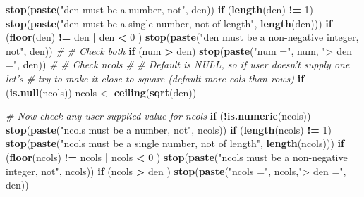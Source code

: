 \documentclass[9pt,letter]{article}
\newenvironment{Shaded}{\begin{snugshade}}{\end{snugshade}}
\newcommand{\KeywordTok}[1]{\textcolor[rgb]{0.13,0.29,0.53}{\textbf{#1}}}
\newcommand{\DecValTok}[1]{\textcolor[rgb]{0.00,0.00,0.81}{#1}}
\newcommand{\StringTok}[1]{\textcolor[rgb]{0.31,0.60,0.02}{#1}}
\newcommand{\CommentTok}[1]{\textcolor[rgb]{0.56,0.35,0.01}{\textit{#1}}}
\newcommand{\ControlFlowTok}[1]{\textcolor[rgb]{0.13,0.29,0.53}{\textbf{#1}}}
\newcommand{\OperatorTok}[1]{\textcolor[rgb]{0.81,0.36,0.00}{\textbf{#1}}}
\newcommand{\NormalTok}[1]{#1}
\begin{document}
\begin{enumerate}
\begin{Shaded}
\begin{Highlighting}[]
    \KeywordTok{stop}\NormalTok{(}\KeywordTok{paste}\NormalTok{(}\StringTok{"den must be a number, not"}\NormalTok{, den))}
  \ControlFlowTok{if}\NormalTok{ (}\KeywordTok{length}\NormalTok{(den) }\OperatorTok{!=}\StringTok{ }\DecValTok{1}\NormalTok{)}
    \KeywordTok{stop}\NormalTok{(}\KeywordTok{paste}\NormalTok{(}\StringTok{"den must be a single number, not of length"}\NormalTok{,}
               \KeywordTok{length}\NormalTok{(den)))}
  \ControlFlowTok{if}\NormalTok{ (}\KeywordTok{floor}\NormalTok{(den) }\OperatorTok{!=}\StringTok{ }\NormalTok{den }\OperatorTok{|}\StringTok{ }\NormalTok{den }\OperatorTok{<}\StringTok{ }\DecValTok{0}\NormalTok{ )}
    \KeywordTok{stop}\NormalTok{(}\KeywordTok{paste}\NormalTok{(}\StringTok{"den must be a non-negative integer, not"}\NormalTok{,}
\NormalTok{               den))}
  \CommentTok{#}
  \CommentTok{#  Check both}
  \ControlFlowTok{if}\NormalTok{ (num }\OperatorTok{>}\StringTok{ }\NormalTok{den)}
    \KeywordTok{stop}\NormalTok{(}\KeywordTok{paste}\NormalTok{(}\StringTok{"num ="}\NormalTok{, num, }\StringTok{"> den ="}\NormalTok{, den))}
  \CommentTok{#}
  \CommentTok{#  Check ncols}
  \CommentTok{#}
  \CommentTok{#  Default is NULL, so if user doesn't supply one let's}
  \CommentTok{#  try to make it close to square (default more cols than rows)}
  \ControlFlowTok{if}\NormalTok{ (}\KeywordTok{is.null}\NormalTok{(ncols)) ncols <-}\StringTok{ }\KeywordTok{ceiling}\NormalTok{(}\KeywordTok{sqrt}\NormalTok{(den))}

  \CommentTok{#  Now check any user supplied value for ncols}
  \ControlFlowTok{if}\NormalTok{ (}\OperatorTok{!}\KeywordTok{is.numeric}\NormalTok{(ncols))}
    \KeywordTok{stop}\NormalTok{(}\KeywordTok{paste}\NormalTok{(}\StringTok{"ncols must be a number, not"}\NormalTok{, ncols))}
  \ControlFlowTok{if}\NormalTok{ (}\KeywordTok{length}\NormalTok{(ncols) }\OperatorTok{!=}\StringTok{ }\DecValTok{1}\NormalTok{)}
    \KeywordTok{stop}\NormalTok{(}\KeywordTok{paste}\NormalTok{(}\StringTok{"ncols must be a single number, not of length"}\NormalTok{,}
               \KeywordTok{length}\NormalTok{(ncols)))}
  \ControlFlowTok{if}\NormalTok{ (}\KeywordTok{floor}\NormalTok{(ncols) }\OperatorTok{!=}\StringTok{ }\NormalTok{ncols }\OperatorTok{|}\StringTok{ }\NormalTok{ncols }\OperatorTok{<}\StringTok{ }\DecValTok{0}\NormalTok{ )}
    \KeywordTok{stop}\NormalTok{(}\KeywordTok{paste}\NormalTok{(}\StringTok{"ncols must be a non-negative integer, not"}\NormalTok{,}
\NormalTok{               ncols))}
  \ControlFlowTok{if}\NormalTok{ (ncols }\OperatorTok{>}\StringTok{ }\NormalTok{den )}
    \KeywordTok{stop}\NormalTok{(}\KeywordTok{paste}\NormalTok{(}\StringTok{"ncols ="}\NormalTok{, ncols,}\StringTok{"> den ="}\NormalTok{, den))}


\end{Highlighting}
\end{Shaded}
\end{enumerate}
\end{document}
